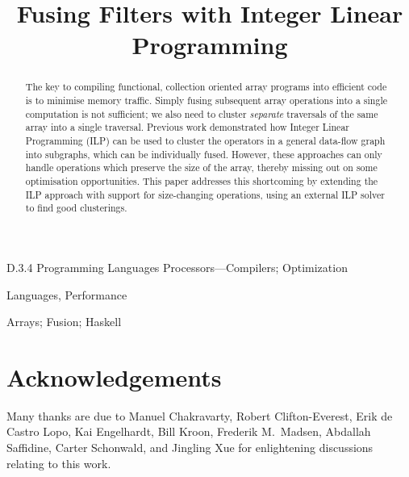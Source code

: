 \documentclass[preprint]{sigplanconf}
\begin{document}
\exclusivelicense
{}


\title{Fusing Filters with Integer Linear Programming}


\maketitle
\makeatactive

\begin{abstract}
The key to compiling functional, collection oriented array programs into efficient code is to minimise memory traffic.
Simply fusing subsequent array operations into a single computation is not sufficient; we also need to cluster \emph{separate} traversals of the same array into a single traversal.
Previous work demonstrated how Integer Linear Programming (ILP) can be used to cluster the operators in a general data-flow graph into subgraphs, which can be individually fused.
However, these approaches can only handle operations which preserve the size of the array, thereby missing out on some optimisation opportunities.
This paper addresses this shortcoming by extending the ILP approach with support for size-changing operations, using an external ILP solver to find good clusterings.
\end{abstract}


\category
	{D.3.4}
	{Programming Languages}
	{Processors---Compilers; Optimization}

\terms
	Languages, Performance

\keywords
	Arrays; Fusion; Haskell







% 


\section*{Acknowledgements}
Many thanks are due to
Manuel Chakravarty,
Robert Clifton-Everest,
Erik de Castro Lopo,
Kai Engelhardt,
Bill Kroon,
Frederik M.\ Madsen,
Abdallah Saffidine,
Carter Schonwald,
and Jingling Xue
for enlightening discussions relating to this work.



\end{document}
